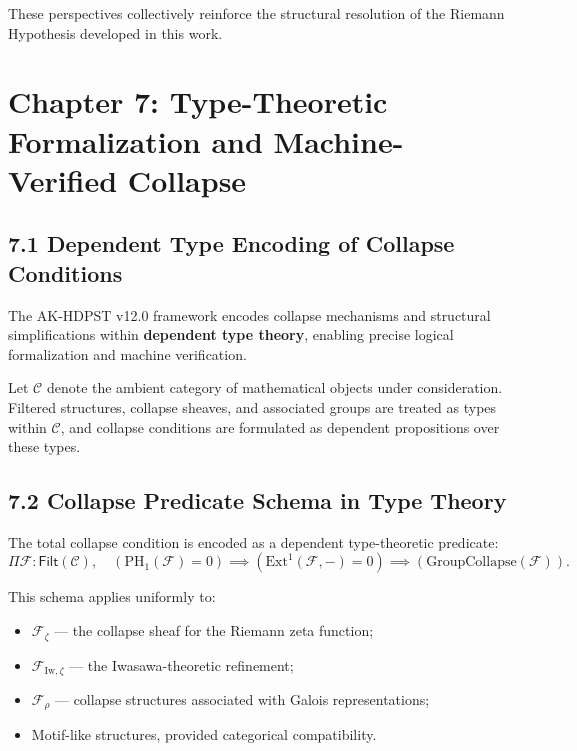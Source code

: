 \documentclass[11pt]{article}
\begin{document}
These perspectives collectively reinforce the structural resolution of the Riemann Hypothesis developed in this work.



\section{Chapter 7: Type-Theoretic Formalization and Machine-Verified Collapse}

\subsection*{7.1 Dependent Type Encoding of Collapse Conditions}

The AK-HDPST v12.0 framework encodes collapse mechanisms and structural simplifications within \textbf{dependent type theory}, enabling precise logical formalization and machine verification.

Let $\mathcal{C}$ denote the ambient category of mathematical objects under consideration. Filtered structures, collapse sheaves, and associated groups are treated as types within $\mathcal{C}$, and collapse conditions are formulated as dependent propositions over these types.

\subsection*{7.2 Collapse Predicate Schema in Type Theory}

The total collapse condition is encoded as a dependent type-theoretic predicate:
\[
\Pi \mathcal{F} : \mathsf{Filt}(\mathcal{C}), \quad 
\left( \mathrm{PH}_1(\mathcal{F}) = 0 \right) \implies 
\left( \mathrm{Ext}^1(\mathcal{F}, -) = 0 \right) \implies 
\left( \mathrm{GroupCollapse}(\mathcal{F}) \right).
\]

This schema applies uniformly to:

\begin{itemize}
    \item $\mathcal{F}_{\zeta}$ — the collapse sheaf for the Riemann zeta function;
    \item $\mathcal{F}_{\mathrm{Iw}, \zeta}$ — the Iwasawa-theoretic refinement;
    \item $\mathcal{F}_\rho$ — collapse structures associated with Galois representations;
    \item Motif-like structures, provided categorical compatibility.
\end{itemize}
\end{document}
